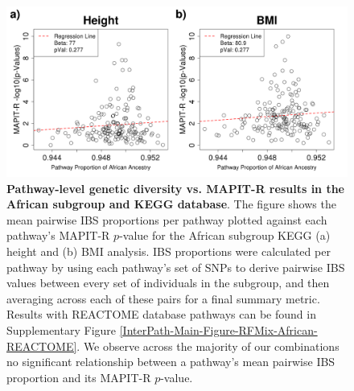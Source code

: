 
\begin{figure}[htbp]
\centering
\includegraphics[scale=.35]{Images/Supp/InterPath_Supp_Figure_RFMix_vs2_African_KEGG_noHLA.png}
\caption[TBD]{\textbf{Pathway-level genetic diversity vs. MAPIT-R results in the African subgroup and KEGG database}. The figure shows the mean pairwise IBS proportions per pathway plotted against each pathway's MAPIT-R $p$-value for the African subgroup KEGG (a) height and (b) BMI analysis. IBS proportions were calculated per pathway by using each pathway's set of SNPs to derive pairwise IBS values between every set of individuals in the subgroup, and then averaging across each of these pairs for a final summary metric. Results with REACTOME database pathways can be found in Supplementary Figure \ref{InterPath-Main-Figure-RFMix-African-REACTOME}. We observe across the majority of our combinations no significant relationship between a pathway's mean pairwise IBS proportion and its MAPIT-R $p$-value.}
\label{InterPath-Supp-Figure-RFMix-African-KEGG}
\end{figure}
\clearpage

